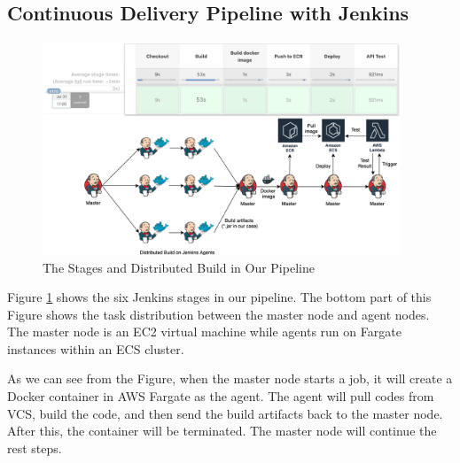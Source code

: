 \subsection{Continuous Delivery Pipeline with Jenkins}
\label{our-ci}
\begin{figure}[h]
 \centering
 \includegraphics[width=0.95\textwidth]{pics/overview.png}
 \caption{The Stages and Distributed Build in Our Pipeline}
 \label{fig:overview}
\end{figure}
Figure \ref{fig:overview} shows the six Jenkins stages in our pipeline. The bottom part of this Figure shows the task distribution between the master node and agent nodes. The master node is an EC2 virtual machine while agents run on Fargate instances within an ECS cluster.
\par
As we can see from the Figure, when the master node starts a job, it will create a Docker container in AWS Fargate as the agent. The agent will pull codes from VCS, build the code, and then send the build artifacts back to the master node. After this, the container will be terminated. The master node will continue the rest steps.
